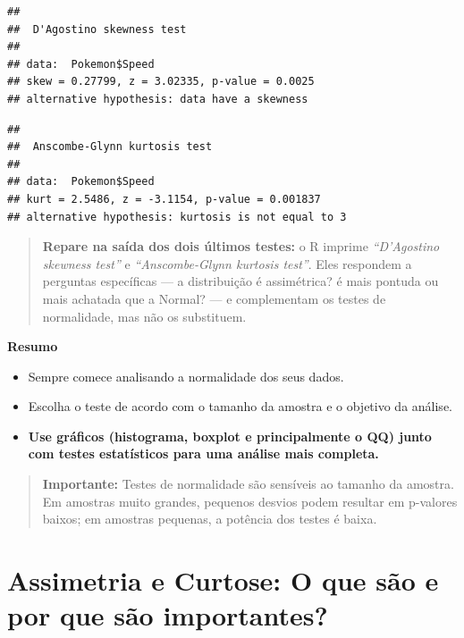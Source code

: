 \documentclass[
]{book}
\newenvironment{Shaded}{\begin{snugshade}}{\end{snugshade}}
\newcommand{\CommentTok}[1]{\textcolor[rgb]{0.56,0.35,0.01}{\textit{#1}}}
\newcommand{\FunctionTok}[1]{\textcolor[rgb]{0.13,0.29,0.53}{\textbf{#1}}}
\newcommand{\NormalTok}[1]{#1}
\newcommand{\SpecialCharTok}[1]{\textcolor[rgb]{0.81,0.36,0.00}{\textbf{#1}}}
\providecommand{\tightlist}{%
  \setlength{\itemsep}{0pt}\setlength{\parskip}{0pt}}
\begin{document}
\begin{verbatim}
## 
##  D'Agostino skewness test
## 
## data:  Pokemon$Speed
## skew = 0.27799, z = 3.02335, p-value = 0.0025
## alternative hypothesis: data have a skewness
\end{verbatim}

\begin{Shaded}
\end{Shaded}

\begin{verbatim}
## 
##  Anscombe-Glynn kurtosis test
## 
## data:  Pokemon$Speed
## kurt = 2.5486, z = -3.1154, p-value = 0.001837
## alternative hypothesis: kurtosis is not equal to 3
\end{verbatim}

\begin{quote}
\textbf{Repare na saída dos dois últimos testes:} o R imprime \emph{``D'Agostino skewness test''} e \emph{``Anscombe-Glynn kurtosis test''}. Eles respondem a perguntas específicas --- a distribuição é assimétrica? é mais pontuda ou mais achatada que a Normal? --- e complementam os testes de normalidade, mas não os substituem.
\end{quote}

\textbf{Resumo}

\begin{itemize}
\tightlist
\item
  Sempre comece analisando a normalidade dos seus dados.
\item
  Escolha o teste de acordo com o tamanho da amostra e o objetivo da análise.
\item
  \textbf{Use gráficos (histograma, boxplot e principalmente o QQ) junto com testes estatísticos para uma análise mais completa.}
\end{itemize}

\begin{quote}
\textbf{Importante:} Testes de normalidade são sensíveis ao tamanho da amostra. Em amostras muito grandes, pequenos desvios podem resultar em p-valores baixos; em amostras pequenas, a potência dos testes é baixa.
\end{quote}

\section{Assimetria e Curtose: O que são e por que são importantes?}\label{assimetria-e-curtose-o-que-suxe3o-e-por-que-suxe3o-importantes}
\end{document}
